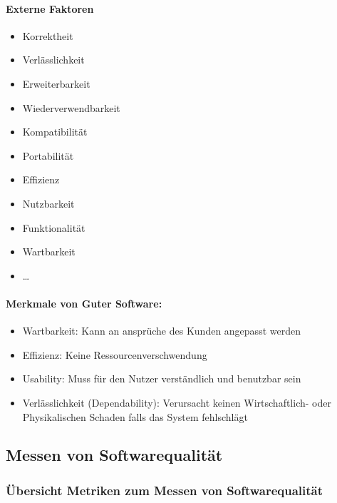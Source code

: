 \documentclass[
    ngerman,
    color=3b,
    summary,
    boxarc,
    main,
]{rubos-tuda-template}
\begin{document}
\paragraph{Externe Faktoren}
\begin{itemize}
    \item Korrektheit
    \item Verlässlichkeit
    \item Erweiterbarkeit
    \item Wiederverwendbarkeit
    \item Kompatibilität
    \item Portabilität
    \item Effizienz
    \item Nutzbarkeit
    \item Funktionalität
    \item Wartbarkeit
    \item \dots
\end{itemize}
\begin{defBox}
    \paragraph{Merkmale von Guter Software:}\begin{itemize}
        \item Wartbarkeit: Kann an ansprüche des Kunden angepasst werden
        \item Effizienz: Keine Ressourcenverschwendung
        \item Usability: Muss für den Nutzer verständlich und benutzbar sein
        \item Verlässlichkeit (Dependability): Verursacht keinen Wirtschaftlich- oder Physikalischen Schaden falls das System fehlschlägt
    \end{itemize}
\end{defBox}

\clearpage
\subsection{Messen von Softwarequalität}
\subsubsection{Übersicht Metriken zum Messen von Softwarequalität}
\label{sec:metrics}
\end{document}
